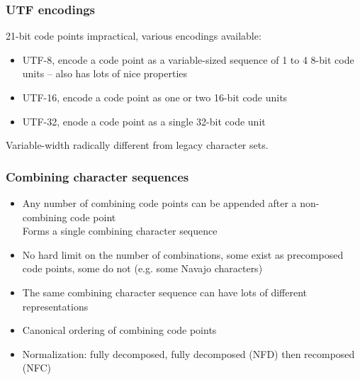 \documentclass{beamer}
\begin{document}
\begin{frame}
	\frametitle{UTF encodings}
	
	21-bit code points impractical, various encodings available:
	
	\begin{itemize}
		\item UTF-8, encode a code point as a variable-sized sequence of 1 to 4 8-bit code units -- also has lots of nice properties
		\item UTF-16, encode a code point as one or two 16-bit code units
		\item UTF-32, enode a code point as a single 32-bit code unit
	\end{itemize}
	\bigskip
	
	Variable-width radically different from legacy character sets.
	
\end{frame}

\begin{frame}
	\frametitle{Combining character sequences}
	
	\begin{itemize}
		\item Any number of combining code points can be appended after a non-combining code point\\
		      Forms a single combining character sequence
		\item No hard limit on the number of combinations, some exist as precomposed code points, some do not (e.g. some Navajo characters)
		\item The same combining character sequence can have lots of different representations
	\end{itemize}
	
	\begin{itemize}
		\item Canonical ordering of combining code points
		\item Normalization: fully decomposed, fully decomposed (NFD) then recomposed (NFC)
	\end{itemize}
	
\end{frame}
\end{document}
